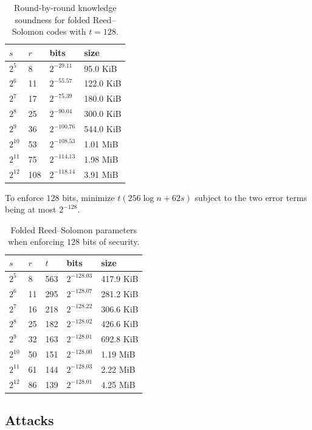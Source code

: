 \documentclass[11pt]{article}
\theoremstyle{plain}
\theoremstyle{definition}
\begin{document}
\begin{table}[htbp]
\centering
\begin{tabular}{llll}
\toprule
$s$ & $r$ & bits & size \\
\midrule
$2^5$ & 8 & $2^{-29.11}$ & 95.0 KiB \\
$2^6$ & 11 & $2^{-55.57}$ & 122.0 KiB \\
$2^7$ & 17 & $2^{-75.39}$ & 180.0 KiB \\
$2^8$ & 25 & $2^{-90.04}$ & 300.0 KiB \\
$2^9$ & 36 & $2^{-100.76}$ & 544.0 KiB \\
$2^{10}$ & 53 & $2^{-108.53}$ & 1.01 MiB \\
$2^{11}$ & 75 & $2^{-114.13}$ & 1.98 MiB \\
$2^{12}$ & 108 & $2^{-118.14}$ & 3.91 MiB \\
\bottomrule
\end{tabular}
\caption{Round-by-round knowledge soundness for folded Reed--Solomon codes with $t=128$.}
\end{table}

To enforce $128$ bits, minimize $t(256\log n+62s)$ subject to the two error terms being at most $2^{-128}$.

\begin{table}[htbp]
\centering
\begin{tabular}{lllll}
\toprule
$s$ & $r$ & $t$ & bits & size \\
\midrule
$2^5$ & 8 & 563 & $2^{-128.03}$ & 417.9 KiB \\
$2^6$ & 11 & 295 & $2^{-128.07}$ & 281.2 KiB \\
$2^7$ & 16 & 218 & $2^{-128.22}$ & 306.6 KiB \\
$2^8$ & 25 & 182 & $2^{-128.02}$ & 426.6 KiB \\
$2^9$ & 32 & 163 & $2^{-128.01}$ & 692.8 KiB \\
$2^{10}$ & 50 & 151 & $2^{-128.00}$ & 1.19 MiB \\
$2^{11}$ & 61 & 144 & $2^{-128.03}$ & 2.22 MiB \\
$2^{12}$ & 86 & 139 & $2^{-128.01}$ & 4.25 MiB \\
\bottomrule
\end{tabular}
\caption{Folded Reed--Solomon parameters when enforcing $128$ bits of security.}
\end{table}

\subsection{Attacks}
\end{document}
